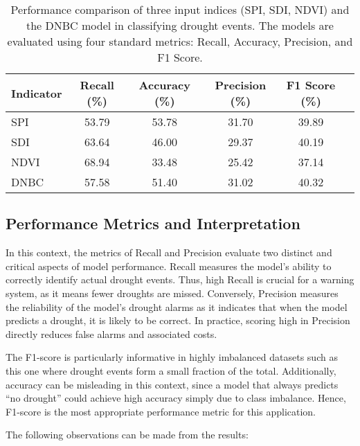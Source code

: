 \begin{table}[!h]
    \centering
    \caption[Performance Metrics of Input Indices \& DNBC]{Performance comparison of three input indices (SPI, SDI, NDVI) and the DNBC model in classifying drought events. The models are evaluated using four standard metrics: Recall, Accuracy, Precision, and F1 Score.}
    \label{tbl:performance_metrics}
    \begin{tabular}{lccccc}
        \toprule
        Indicator & Recall (\%) & Accuracy (\%) & Precision (\%)  & F1 Score (\%) \\
        \midrule
        SPI       & 53.79   & 53.78         & 31.70           & 39.89         \\
        SDI       & 63.64   & 46.00         & 29.37           & 40.19         \\
        NDVI      & 68.94   & 33.48         & 25.42           & 37.14         \\
        DNBC      & 57.58   & 51.40         & 31.02           & 40.32         \\
        \bottomrule
    \end{tabular}
\end{table}

\subsection{Performance Metrics and Interpretation}

In this context, the metrics of Recall and Precision evaluate two distinct and critical aspects of model performance. Recall measures the model's ability to correctly identify actual drought events. Thus, high Recall is crucial for a warning system, as it means fewer droughts are missed. Conversely, Precision measures the reliability of the model's drought alarms as it indicates that when the model predicts a drought, it is likely to be correct. In practice, scoring high in Precision directly reduces false alarms and associated costs.

The F1-score is particularly informative in highly imbalanced datasets such as this one where drought events form a small fraction of the total. Additionally, accuracy can be misleading in this context, since a model that always predicts “no drought” could achieve high accuracy simply due to class imbalance. Hence, F1-score is the most appropriate performance metric for this application.

The following observations can be made from the results:


